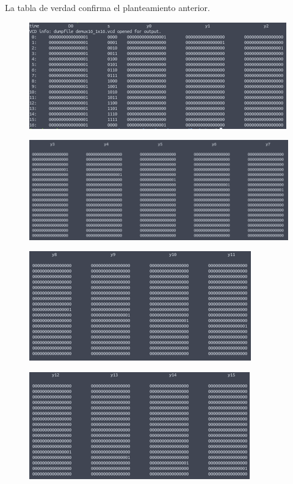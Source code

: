 \documentclass[11pt,a4paper]{article}
\begin{document}
\begin{enumerate}
\begin{enumerate}[label=(\alph*)]
La tabla de verdad confirma el planteamiento anterior.
\begin{figure}[h!]
\centering
\includegraphics[scale=0.6]{16_1x16DEMUX_31.png} 
\end{figure}
\begin{figure}[h!]
\centering
\includegraphics[scale=0.6]{16_1x16DEMUX_32.png} 
\end{figure}
\begin{figure}[h!]
\centering
\includegraphics[scale=0.6]{16_1x16DEMUX_33.png} 
\end{figure}
\begin{figure}[h!]
\centering
\includegraphics[scale=0.6]{16_1x16DEMUX_34.png} 
\end{figure}
\pagebreak


\end{enumerate}
\end{enumerate}
\end{document}
